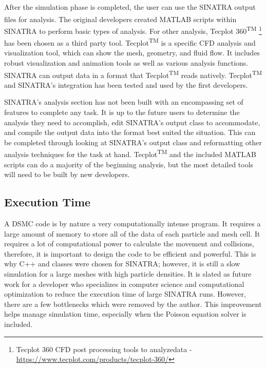  After the simulation phase is completed, the user can use the SINATRA output files for analysis. The original developers created MATLAB\textsuperscript{\textregistered} scripts within SINATRA to perform basic types of analysis. For other analysis, Tecplot 360\textsuperscript{TM} \footnote{Tecplot 360 CFD post processing tools to analyzedata - \url{https://www.tecplot.com/products/tecplot-360/}} has been chosen as a third party tool. Tecplot\textsuperscript{TM} is a specific CFD analysis and visualization tool, which can show the mesh, geometry, and fluid flow. It includes robust visualization and animation tools as well as various analysis functions. SINATRA can output data in a format that Tecplot\textsuperscript{TM} reads natively. Tecplot\textsuperscript{TM} and SINATRA's integration has been tested and used by the first developers.\par
 \indent SINATRA's analysis section has not been built with an encompassing set of features to complete any task. It is up to the future users to determine the analysis they need to accomplish, edit SINATRA's output class to accommodate, and compile the output data into the format best suited the situation. This can be completed through looking at SINATRA's output class and reformatting other analysis techniques for the task at hand. Tecplot\textsuperscript{TM} and the included MATLAB\textsuperscript{\textregistered} scripts can do a majority of the beginning analysis, but the most detailed tools will need to be built by new developers.

 
\subsection{Execution Time}
\label{sec:execution}
A DSMC code is by nature a very computationally intense program. It requires a large amount of memory to store all of the data of each particle and mesh cell. It requires a lot of computational power to calculate the movement and collisions, therefore, it is important to design the code to be efficient and powerful. This is why C++ and classes were chosen for SINATRA; however, it is still a slow simulation for a large meshes with high particle densities. It is slated as future work for a developer who specializes in computer science and computational optimization to reduce the execution time of large SINATRA runs. However, there are a few bottlenecks which were removed by the author. This improvement helps manage simulation time, especially when the Poisson equation solver is included. \par

